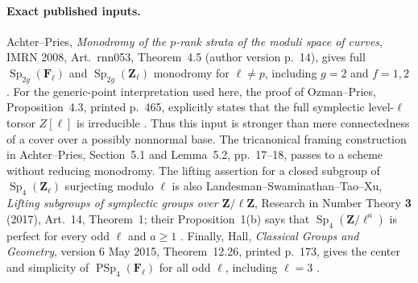 \documentclass[11pt,a4paper]{article}
\begin{document}
\paragraph{Exact published inputs.}
Achter--Pries, \emph{Monodromy of the $p$-rank strata of the
moduli space of curves}, IMRN 2008, Art.~rnn053,
Theorem~4.5 (author version p.~14), gives full
$\operatorname{Sp}_{2g}(\mathbf F_\ell)$ and
$\operatorname{Sp}_{2g}(\mathbf Z_\ell)$ monodromy for
$\ell\ne p$, including $g=2$ and $f=1,2$
\cite{AchterPries2008}.
For the generic-point interpretation used here, the proof
of Ozman--Pries, Proposition~4.3, printed p.~465, explicitly
states that the full symplectic level-$\ell$ torsor $Z[\ell]$
is irreducible \cite[Proposition~4.3, proof]{OzmanPries2019}.
Thus this input is stronger than mere
connectedness of a cover over a possibly nonnormal base.
The tricanonical framing construction in Achter--Pries,
Section~5.1 and Lemma~5.2, pp.~17--18, passes to a scheme
without reducing monodromy.  The lifting assertion for a
closed subgroup of $\operatorname{Sp}_4(\mathbf Z_\ell)$
surjecting modulo $\ell$ is also
Landesman--Swaminathan--Tao--Xu,
\emph{Lifting subgroups of symplectic groups over
$\mathbf Z/\ell\mathbf Z$}, Research in Number Theory \textbf{3}
(2017), Art.~14, Theorem~1; their Proposition~1(b) says that
$\operatorname{Sp}_4(\mathbf Z/\ell^a)$ is perfect for every
odd $\ell$ and $a\ge1$ \cite{LSTX2017}.  Finally, Hall,
\emph{Classical Groups and Geometry}, version 6 May 2015,
Theorem~12.26, printed p.~173, gives the center and simplicity
of $\operatorname{PSp}_4(\mathbf F_\ell)$ for all odd $\ell$,
including $\ell=3$ \cite{Hall2015}.
\end{document}
